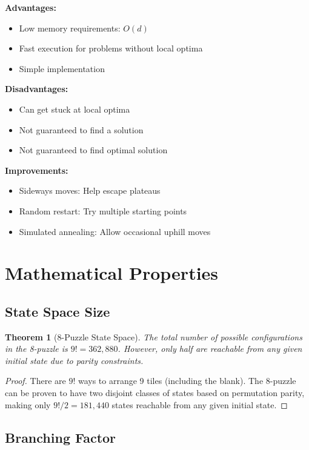 \documentclass[12pt,a4paper]{article}
\newtheorem{theorem}{Theorem}
\begin{document}
\textbf{Advantages:}
\begin{itemize}
    \item Low memory requirements: $O(d)$
    \item Fast execution for problems without local optima
    \item Simple implementation
\end{itemize}

\textbf{Disadvantages:}
\begin{itemize}
    \item Can get stuck at local optima
    \item Not guaranteed to find a solution
    \item Not guaranteed to find optimal solution
\end{itemize}

\textbf{Improvements:}
\begin{itemize}
    \item Sideways moves: Help escape plateaus
    \item Random restart: Try multiple starting points
    \item Simulated annealing: Allow occasional uphill moves
\end{itemize}

\section{Mathematical Properties}

\subsection{State Space Size}

\begin{theorem}[8-Puzzle State Space]
The total number of possible configurations in the 8-puzzle is $9! = 362,880$. However, only half are reachable from any given initial state due to parity constraints.
\end{theorem}

\begin{proof}
There are $9!$ ways to arrange 9 tiles (including the blank). The 8-puzzle can be proven to have two disjoint classes of states based on permutation parity, making only $9!/2 = 181,440$ states reachable from any given initial state.
\end{proof}

\subsection{Branching Factor}
\end{document}
